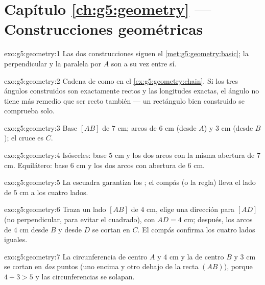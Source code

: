 \section*{Capítulo \ref{ch:g5:geometry} --- Construcciones geométricas}

\begin{solution}{exo:g5:geometry:1}
Las dos construcciones siguen el \cref{met:g5:geometry:basic}; la
perpendicular y la paralela por $A$ son a su vez
 entre sí.
\end{solution}

\begin{solution}{exo:g5:geometry:2}
Cadena de  como en el \cref{ex:g5:geometry:chain}. Si los
tres ángulos construidos son exactamente rectos y las longitudes exactas, el
 ángulo no tiene más remedio que ser recto también --- un
rectángulo bien construido se comprueba solo.
\end{solution}

\begin{solution}{exo:g5:geometry:3}
Base $[AB]$ de $7$ cm; arcos de  $6$ cm (desde $A$) y $3$ cm
(desde $B$); el cruce es $C$.
\end{solution}

\begin{solution}{exo:g5:geometry:4}
Isósceles: base $5$ cm y los dos arcos con la misma abertura de $7$ cm.
Equilátero: base $6$ cm y los dos arcos con abertura de $6$ cm.
\end{solution}

\begin{solution}{exo:g5:geometry:5}
La escuadra garantiza los ; el compás (o la
regla) lleva el lado de $5$ cm a los cuatro lados.
\end{solution}

\begin{solution}{exo:g5:geometry:6}
Traza un lado $[AB]$ de $4$ cm, elige una dirección para $[AD]$ (no
perpendicular, para evitar el cuadrado), con $AD = 4$ cm; después, los arcos de
$4$ cm desde $B$ y desde $D$ se cortan en $C$. El compás confirma los
cuatro lados iguales.
\end{solution}

\begin{solution}{exo:g5:geometry:7}
La circunferencia de centro $A$ y  $4$ cm y la de centro
$B$ y  $3$ cm se cortan en \emph{dos} puntos (uno encima y otro debajo
de la recta $(AB)$), porque $4 + 3 > 5$ y las circunferencias se solapan.
\end{solution}

